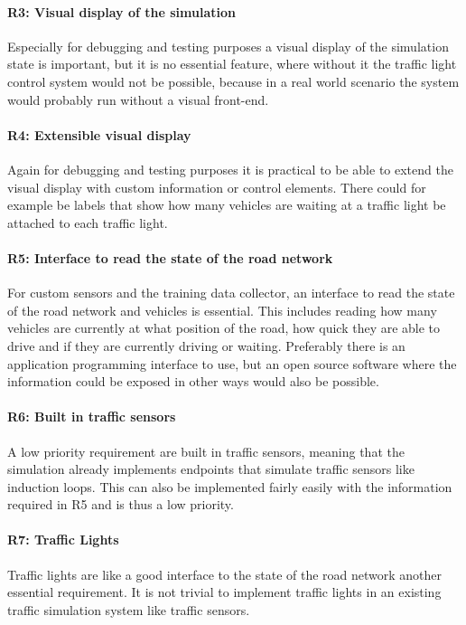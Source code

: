 \paragraph{R3: Visual display of the simulation} Especially for debugging and testing purposes a visual display of the simulation state is important, but it is no essential feature, where without it the traffic light control system would not be possible, because in a real world scenario the system would probably run without a visual front-end.

\paragraph{R4: Extensible visual display} Again for debugging and testing purposes it is practical to be able to extend the visual display with custom information or control elements. There could for example be labels that show how many vehicles are waiting at a traffic light be attached to each traffic light.

\paragraph{R5: Interface to read the state of the road network} For custom sensors and the training data collector, an interface to read the state of the road network and vehicles is essential. This includes reading how many vehicles are currently at what position of the road, how quick they are able to drive and if they are currently driving or waiting. Preferably there is an application programming interface to use, but an open source software where the information could be exposed in other ways would also be possible.

\paragraph{R6: Built in traffic sensors} A low priority requirement are built in traffic sensors, meaning that the simulation already implements endpoints that simulate traffic sensors like induction loops. This can also be implemented fairly easily with the information required in R5 and is thus a low priority.

\paragraph{R7: Traffic Lights} Traffic lights are like a good interface to the state of the road network another essential requirement. It is not trivial to implement traffic lights in an existing traffic simulation system like traffic sensors.

